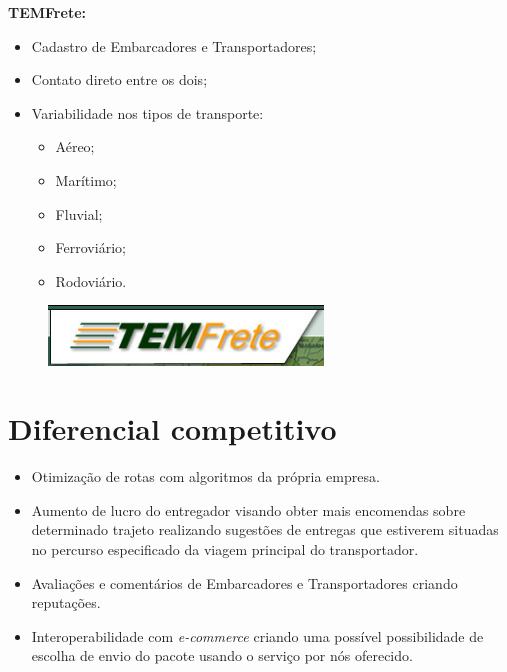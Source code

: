 		\begin{minipage}{0.48\textwidth}
			
			\textbf{TEMFrete:}
				\begin{itemize}
					\item Cadastro de Embarcadores e Transportadores;
					\item Contato direto entre os dois;
					\item Variabilidade nos tipos de transporte:
					\begin{itemize}
						\item Aéreo;
						\item Marítimo;
						\item Fluvial;
						\item Ferroviário;
						\item Rodoviário.
					\end{itemize}
				\end{itemize}
		\end{minipage}
		\begin{minipage}{0.48\textwidth}
			
			\begin{figure}[H]
				\centering
				\includegraphics[width=0.65\textwidth]{img/temfrete.png}
			\end{figure}
			
		\end{minipage}
				
                
	
	\section{Diferencial competitivo}
		\begin{itemize}
			\item Otimização de rotas com algoritmos da própria empresa.
			
			\item Aumento de lucro do entregador visando obter mais encomendas sobre determinado trajeto realizando sugestões de entregas que estiverem situadas no percurso especificado da viagem principal do transportador.
			
			\item Avaliações e comentários de Embarcadores e Transportadores criando reputações.
			
			\item Interoperabilidade com \textit{e-commerce} criando uma possível possibilidade de escolha de envio do pacote usando o serviço por nós oferecido.
		\end{itemize}
	
